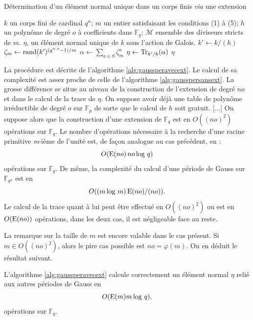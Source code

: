 \documentclass[a4paper]{article} %
\numberwithin{section}{part}
\numberwithin{equation}{section}
\newcommand\nroot[1]{\textit{#1}-ième}
\newcommand\GF[1]{\mathbb{F}_{#1}}
\newcommand\E[1]{\textup{E}(#1)}
\begin{document}
\vspace{0.3cm}
\begin{algorithm}
\caption{Détermination d'un élément normal unique dans un corps finis
\textit{via} une extension}
\label{alg:gaussperavecext}
\begin{algorithmic}[1]
\REQUIRE $k$ un corps fini de cardinal $q^n$; $m$ un entier satisfaisant les 
conditions (1) à (5); $h$ un polynôme de degré $o$ à coefficients dans $\GF{q}$;
$\mathcal{M}$ ensemble des diviseurs stricts de
$m$.
\ENSURE $\eta$, un élément normal unique de $k$ sous l'action de Galois.
\bigskip
\STATE $k' \leftarrow k/(h)$
\REPEAT
    \STATE $\zeta_m \leftarrow \textup{rand}(k')^{(q^{n.o} - 1)/m}$
\STATE $\alpha \leftarrow \sum_{a\in S}{\zeta_m^a}$
\STATE $\eta \leftarrow \textup{Tr}_{k'/k}(\alpha)$
\RETURN $\eta$
\end{algorithmic}
\end{algorithm}
La procédure est décrite de l'algorithme \ref{alg:gaussperavecext}. Le calcul de
sa complexité est assez proche de celle de l'algorithme 
\ref{alg:gausspersansext}. La grosse différence se situe au niveau de la 
construction de l'extension de degré $no$ et dans le calcul de la trace de 
$\eta$. On suppose avoir déjà une table de polynôme irréductible de degré $o$ 
sur $\GF{p}$ de sorte que le calcul de $h$ soit gratuit. [...] On suppose alors 
que la construction d'une extension de $\GF{q}$ est en $O((no)^2)$ opérations 
sur $\GF{q}$. Le nombre d'opérations nécessaire à la recherche d'une racine 
primitive \nroot{m} de l'unité est, de façon analogue au cas précédent, en :
\begin{equation}
O(\E{no}\,no\,\textup{log }q)
\end{equation}
opérations sur $\GF{q}$. De même, la complexité du calcul d'une période de Gauss
sur $\GF{q^n}$ est en 
\begin{equation}
O((m\,\textup{log }m)\,\E{no}/(no)).
\end{equation}
Le calcul de la trace quant à lui peut être effectué en $O((no)^2)$ ou est en
$O(\E{no})$ opérations, dans les deux cas, il est négligeable face au reste.\par
La remarque sur la taille de $m$ est encore valable dans le cas présent. Si
$m\in O((no)^2)$, alors le pire cas possible est $no = \varphi(m)$. On en déduit
le résultat suivant.
\begin{prop} 
\label{prop:algavecext}
L'algorithme \ref{alg:gaussperavecext} calcule correctement un élément normal
$\eta$ relié aux autres périodes de Gauss en 
\begin{equation}
O(\E{m}m\,\textup{log }q).
\end{equation}
opérations sur $\GF{q}$.
\end{prop}
\end{document}

